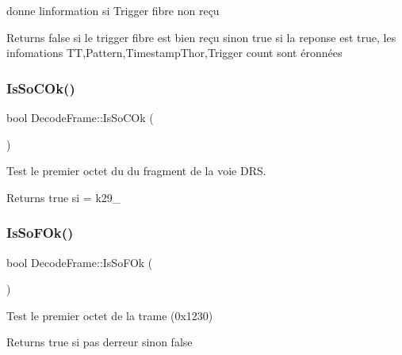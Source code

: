 donne l\textquotesingle{}information si Trigger fibre non reçu 

\begin{DoxyReturn}{Returns}
false si le trigger fibre est bien reçu sinon true si la reponse est true, les infomations TT,Pattern,Timestamp\+Thor,Trigger count sont éronnées 
\end{DoxyReturn}
\mbox{\label{classDecodeFrame_aa778340ea2650ce866f2aac9a59368d4}} 
\subsubsection{\texorpdfstring{Is\+So\+C\+Ok()}{IsSoCOk()}}
{\footnotesize\ttfamily bool Decode\+Frame\+::\+Is\+So\+C\+Ok (\begin{DoxyParamCaption}{ }\end{DoxyParamCaption})\hspace{0.3cm}{\ttfamily [inline]}}



Test le premier octet du du fragment de la voie D\+RS. 

\begin{DoxyReturn}{Returns}
true si = k29\+\_ 
\end{DoxyReturn}
\mbox{\label{classDecodeFrame_af2b5f1f869480dd72404b2fc3f1bac80}} 
\subsubsection{\texorpdfstring{Is\+So\+F\+Ok()}{IsSoFOk()}}
{\footnotesize\ttfamily bool Decode\+Frame\+::\+Is\+So\+F\+Ok (\begin{DoxyParamCaption}{ }\end{DoxyParamCaption})\hspace{0.3cm}{\ttfamily [inline]}}



Test le premier octet de la trame (0x1230) 

\begin{DoxyReturn}{Returns}
true si pas d\textquotesingle{}erreur sinon false 
\end{DoxyReturn}
\mbox{\label{classDecodeFrame_a7b107fcd9fdc586f4ba9eee981a95e4f}} 
